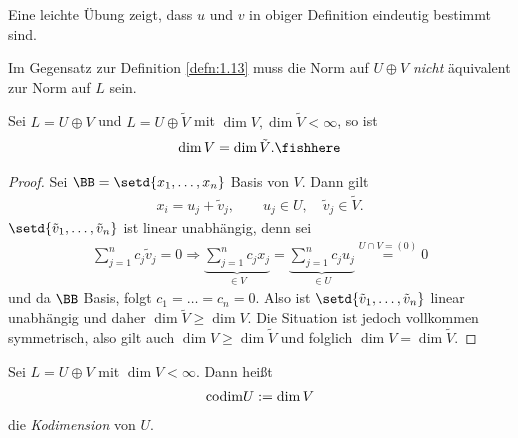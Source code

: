Eine leichte Übung zeigt, dass $u$ und $v$ in obiger Definition eindeutig
bestimmt sind.

Im Gegensatz zur Definition \ref{defn:1.13} muss die Norm auf $U\oplus V$
\textit{nicht} äquivalent zur Norm auf $L$ sein.

\begin{lem}
\label{lem:6.25}
Sei $L=U\oplus V$ und $L=U\oplus \tilde{V}$ mit $\dim V,\dim \tilde{V} <
\infty$, so ist
\begin{align*}
\dim V = \dim \tilde{V}.\fishhere
\end{align*}
\end{lem}
\begin{proof}
Sei $\BB=\setd{x_1,\ldots,x_n}$ Basis von $V$. Dann gilt
\begin{align*}
x_i = u_j + \tilde{v}_j,\qquad u_j\in U,\quad \tilde{v}_j \in \tilde{V}.
\end{align*}
$\setd{\tilde{v}_1,\ldots,\tilde{v}_n}$ ist linear unabhängig, denn sei
\begin{align*}
\sum_{j=1}^n c_j \tilde{v}_j = 0
\Rightarrow
\underbrace{\sum_{j=1}^n c_j x_j}_{\in V} = 
\underbrace{\sum_{j=1}^n c_j u_j}_{\in U} \overset{U\cap V=(0)}{=} 0
\end{align*}
und da $\BB$ Basis, folgt $c_1=\ldots=c_n=0$. Also ist
$\setd{\tilde{v}_1,\ldots,\tilde{v}_n}$ linear unabhängig und daher $\dim
\tilde{V}\ge \dim V$. Die Situation ist jedoch vollkommen symmetrisch, also
gilt auch $\dim V \ge \dim \tilde{V}$ und folglich $\dim V = \dim
\tilde{V}$.\qedhere
\end{proof}

\begin{defn}
\label{defn:6.26}
Sei $L=U\oplus V$ mit $\dim V < \infty$. Dann heißt
\begin{align*}
\mathrm{codim} U := \dim V
\end{align*}
die \emph{Kodimension} von $U$.\fishhere
\end{defn}

